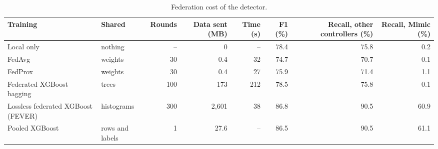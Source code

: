 \begin{table}[t]
\centering
\caption{Federation cost of the detector.}
\label{tab:fedcost}
\small
\begin{tabular}{llrrrrrr}
\toprule
Training & Shared & Rounds & Data sent (MB) & Time (s) & F1 (\%) & Recall, other controllers (\%) & Recall, Mimic (\%) \\
\midrule
Local only & nothing & -- & 0 & -- & 78.4 & 75.8 & 0.2 \\
FedAvg & weights & 30 & 0.4 & 32 & 74.7 & 70.7 & 0.1 \\
FedProx & weights & 30 & 0.4 & 27 & 75.9 & 71.4 & 1.1 \\
Federated XGBoost bagging & trees & 100 & 173 & 212 & 78.5 & 75.8 & 0.1 \\
Lossless federated XGBoost (FEVER) & histograms & 300 & 2{,}601 & 38 & 86.8 & 90.5 & 60.9 \\
Pooled XGBoost & rows and labels & 1 & 27.6 & -- & 86.5 & 90.5 & 61.1 \\
\bottomrule
\end{tabular}
\end{table}
